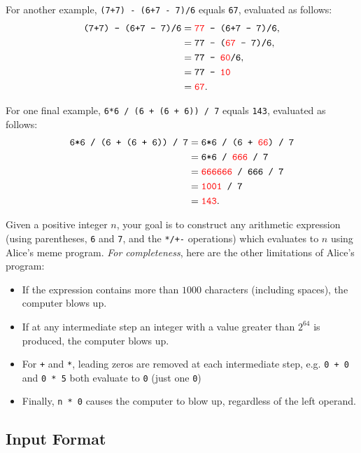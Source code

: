 For another example, \texttt{(7+7) - (6+7 - 7)/6} equals \texttt{67}, evaluated as follows:
\begin{align*}
    \texttt{(7+7) - (6+7 - 7)/6}
    &= \texttt{{\color{red}77} - (6+7 - 7)/6}, \\
    &= \texttt{77 - ({\color{red}67} - 7)/6}, \\
    &= \texttt{77 - {\color{red}60}/6}, \\
    &= \texttt{77 - \color{red}10} \\
    &= \texttt{\color{red}67}.
\end{align*}

For one final example, \texttt{6*6 / (6 + (6 + 6)) / 7} equals \texttt{143}, evaluated as follows:
\begin{align*}
    \texttt{6*6 / (6 + (6 + 6)) / 7}
    &= \texttt{6*6 / (6 + {\color{red}66}) / 7} \\
    &= \texttt{6*6 / {\color{red}666} / 7} \\
    &= \texttt{{\color{red}666666} / 666 / 7} \\
    &= \texttt{{\color{red}1001} / 7} \\
    &= \texttt{{\color{red}143}}.
\end{align*}

Given a positive integer $n$, your goal is to construct any arithmetic expression (using parentheses, \texttt{6} and \texttt{7}, and the \texttt{*/+-} operations) which evaluates to $n$ using Alice's meme program.  \textit{For completeness}, here are the other limitations of Alice's program:
\begin{itemize}
    \item If the expression contains more than $1000$ characters (including spaces), \newline the computer blows up.
    \item If at any intermediate step an integer with a value greater than $2^{64}$ is produced, \newline the computer blows up.
    \item For \texttt{+} and \texttt{*}, leading zeros are removed at each intermediate step, \newline e.g. \texttt{0 + 0} and \texttt{0 * 5} both evaluate to \texttt{0} (just one \texttt{0})
    \item Finally, \texttt{n * 0} causes the computer to blow up, regardless of the left operand.
\end{itemize}

\subsection*{Input Format}

